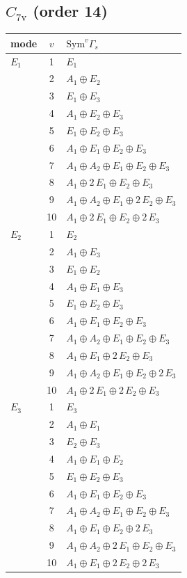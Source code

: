 \documentclass[11pt]{article}
\begin{document}
\subsection*{$C_{7\mathrm{v}}$ \quad (order 14)}
\begin{longtable}{l c p{}}
\hline mode & $v$ & $\mathrm{Sym}^v\Gamma_s$\\ \hline\endhead
$E_{1}$ & 1 & $E_{1}$\\
 & 2 & $A_{1}\oplus E_{2}$\\
 & 3 & $E_{1}\oplus E_{3}$\\
 & 4 & $A_{1}\oplus E_{2}\oplus E_{3}$\\
 & 5 & $E_{1}\oplus E_{2}\oplus E_{3}$\\
 & 6 & $A_{1}\oplus E_{1}\oplus E_{2}\oplus E_{3}$\\
 & 7 & $A_{1}\oplus A_{2}\oplus E_{1}\oplus E_{2}\oplus E_{3}$\\
 & 8 & $A_{1}\oplus 2\,E_{1}\oplus E_{2}\oplus E_{3}$\\
 & 9 & $A_{1}\oplus A_{2}\oplus E_{1}\oplus 2\,E_{2}\oplus E_{3}$\\
 & 10 & $A_{1}\oplus 2\,E_{1}\oplus E_{2}\oplus 2\,E_{3}$\\
\hline
$E_{2}$ & 1 & $E_{2}$\\
 & 2 & $A_{1}\oplus E_{3}$\\
 & 3 & $E_{1}\oplus E_{2}$\\
 & 4 & $A_{1}\oplus E_{1}\oplus E_{3}$\\
 & 5 & $E_{1}\oplus E_{2}\oplus E_{3}$\\
 & 6 & $A_{1}\oplus E_{1}\oplus E_{2}\oplus E_{3}$\\
 & 7 & $A_{1}\oplus A_{2}\oplus E_{1}\oplus E_{2}\oplus E_{3}$\\
 & 8 & $A_{1}\oplus E_{1}\oplus 2\,E_{2}\oplus E_{3}$\\
 & 9 & $A_{1}\oplus A_{2}\oplus E_{1}\oplus E_{2}\oplus 2\,E_{3}$\\
 & 10 & $A_{1}\oplus 2\,E_{1}\oplus 2\,E_{2}\oplus E_{3}$\\
\hline
$E_{3}$ & 1 & $E_{3}$\\
 & 2 & $A_{1}\oplus E_{1}$\\
 & 3 & $E_{2}\oplus E_{3}$\\
 & 4 & $A_{1}\oplus E_{1}\oplus E_{2}$\\
 & 5 & $E_{1}\oplus E_{2}\oplus E_{3}$\\
 & 6 & $A_{1}\oplus E_{1}\oplus E_{2}\oplus E_{3}$\\
 & 7 & $A_{1}\oplus A_{2}\oplus E_{1}\oplus E_{2}\oplus E_{3}$\\
 & 8 & $A_{1}\oplus E_{1}\oplus E_{2}\oplus 2\,E_{3}$\\
 & 9 & $A_{1}\oplus A_{2}\oplus 2\,E_{1}\oplus E_{2}\oplus E_{3}$\\
 & 10 & $A_{1}\oplus E_{1}\oplus 2\,E_{2}\oplus 2\,E_{3}$\\
\hline
\end{longtable}
\end{document}
